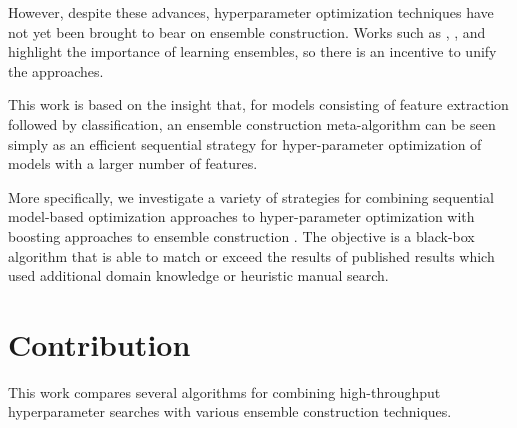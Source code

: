 \documentclass[11pt,twocolumn]{article}
\begin{document}
\vspace{11pt}
However, despite these advances, hyperparameter optimization techniques have not 
yet been brought to bear on ensemble construction.  Works such as \citet{gehler}, \citet{coates+lee+ng:2010},
and \citet{fg11} highlight the importance of learning ensembles, so there is an incentive
to unify the approaches.  

\vspace{11pt}
This work is based on the insight that, for models consisting of feature extraction followed by classification, 
an ensemble construction meta-algorithm can be seen simply as an
efficient sequential strategy for hyper-parameter optimization of 
models with a larger number of features.

\vspace{11pt}
More specifically, we investigate a variety of strategies for combining sequential model-based
optimization approaches to hyper-parameter optimization with boosting
approaches to ensemble construction \citep{mason,friedman}.  
The objective is a black-box algorithm that is able to match or exceed the
results of published results which used additional domain knowledge or
heuristic manual search.

\section{Contribution}

This work compares several algorithms for combining high-throughput hyperparameter searches with various ensemble construction techniques.
\end{document}

